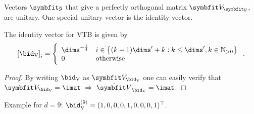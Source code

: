 Vectors $\vc y$ that give a perfectly orthogonal matrix $\mat V_{\vc y}$, are unitary.
One special unitary vector is the identity vector.
\begin{corollary}
    The identity vector for VTB is given by
    \begin{equation}
        \sbr{\bid_{\ped{V}}}_i = \left\{ \begin{array}{ll}
                \dims^{-\frac{1}{4}} & i \in \cbr{(k - 1) \dims' + k : k \leq \dims', k \in \mathbb{N}_{>0}} \\
                0 & \text{otherwise}
        \end{array}\right. \text{.}
    \end{equation}
    \begin{proof}
        By writing $\bid_{\ped{V}}$ as $\mat V_{\bid_{\ped{V}}}$ one can easily verify that $\mat V_{\bid_{\ped{V}}} = \imat\ \Rightarrow\ \bar{\mat V}_{\bid_{\ped{V}}} = \imat$.
    \end{proof}
\end{corollary}
Example for $d = 9$: $\bid_{\ped{V}}^{(9)} = (1, 0, 0, 0, 1, 0, 0, 0, 1)\Tr$.

